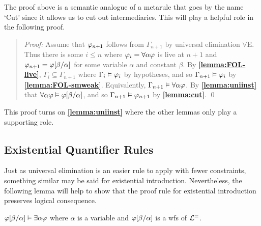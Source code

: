 The proof above is a semantic analogue of a metarule that goes by the name `Cut' since it allows us to cut out intermediaries.
This will play a helpful role in the following proof.




\begin{quote} 
  \textit{Proof:} Assume that $\varphi_{n+1}$ follows from $\Gamma_{n+1}$ by universal elimination $\forall$E.
  Thus there is some $i\leq n$ where $\varphi_i=\forall \alpha\varphi$ is live at $n+1$ and $\varphi_{n+1}=\varphi[\beta/\alpha]$ for some variable $\alpha$ and constant $\beta$.
  By \textbf{\ref{lemma:FOL-live}}, $\Gamma_i\subseteq \Gamma_{n+1}$ where $\Gamma_i\vDash\varphi_i$ by hypotheses, and so $\Gamma_{n+1} \vDash \varphi_i$ by \textbf{\ref{lemma:FOL-smweak}}.
  Equivalently, $\Gamma_{n+1} \vDash \forall \alpha\varphi$.
  By \textbf{\ref{lemma:uniinst}} that $\forall \alpha\varphi\vDash \varphi[\beta/\alpha]$, and so $\Gamma_{n+1}\vDash\varphi_{n+1}$ by \textbf{\ref{lemma:cut}}.
  \qed
\end{quote}

This proof turns on \textbf{\ref{lemma:uniinst}} where the other lemmas only play a supporting role.





\subsection{Existential Quantifier Rules}%
  \label{sub:ExistentialRules}
 
Just as universal elimination is an easier rule to apply with fewer constraints, something similar may be said for existential introduction.
Nevertheless, the following lemma will help to show that the proof rule for existential introduction preserves logical consequence.

\begin{Lthm} \label{lemma:exigen}
  $\varphi[\beta/\alpha] \vDash \exists\alpha\varphi$ where $\alpha$ is a variable and $\varphi[\beta/\alpha]$ is a wfs of $\mathcal{L}^{=}$. 
\end{Lthm}

